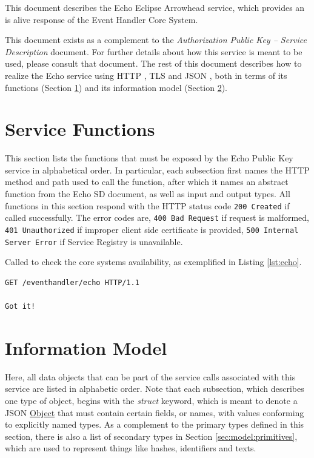 \documentclass[a4paper]{arrowhead}
\newcommand{\fref}[1]{{\textcolor{ArrowheadBlue}{\hyperref[sec:functions:#1]{#1}}}}
\newcommand{\pref}[1]{{\textcolor{ArrowheadGrey}{\hyperref[sec:model:primitives:#1]{#1}}}}
\begin{document}
This document describes the Echo Eclipse Arrowhead service, which provides an is alive response of the Event Handler Core System.

This document exists as a complement to the \textit{Authorization Public Key -- Service Description} document.
For further details about how this service is meant to be used, please consult that document.
The rest of this document describes how to realize the Echo service using HTTP \cite{fielding2014hypertext}, TLS \cite{rescorla2018transport} and JSON \cite{bray2014json}, both in terms of its functions (Section \ref{sec:functions}) and its information model (Section \ref{sec:model}).

\newpage

\section{Service Functions}
\label{sec:functions}

This section lists the functions that must be exposed by the  Echo Public Key service in alphabetical order.
In particular, each subsection first names the HTTP method and path used to call the function, after which it names an abstract function from the Echo SD document, as well as input and output types.
All functions in this section respond with the HTTP status code \texttt{200 Created} if called successfully. The error codes are, \texttt{400 Bad Request} if request is malformed, \texttt{401 Unauthorized} if improper client side certificate is provided, \texttt{500 Internal Server Error} if Service Registry is unavailable.


Called to check the core systems availability, as exemplified in Listing \ref{lst:echo}.

\begin{lstlisting}[language=http,label={lst:echo},caption={An \fref{Echo} invocation response.}]
GET /eventhandler/echo HTTP/1.1

Got it!
\end{lstlisting}

\newpage

\section{Information Model}
\label{sec:model}

Here, all data objects that can be part of the service calls associated with this service are listed in alphabetic order.
Note that each subsection, which describes one type of object, begins with the \textit{struct} keyword, which is meant to denote a JSON \pref{Object} that must contain certain fields, or names, with values conforming to explicitly named types.
As a complement to the primary types defined in this section, there is also a list of secondary types in Section \ref{sec:model:primitives}, which are used to represent things like hashes, identifiers and texts.
\end{document}
